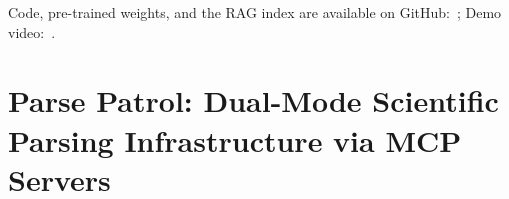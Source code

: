 Code, pre-trained weights, and the RAG index are available on GitHub:  
\,; Demo video: \,.








\section{Parse Patrol: Dual-Mode Scientific Parsing Infrastructure via MCP Servers}




